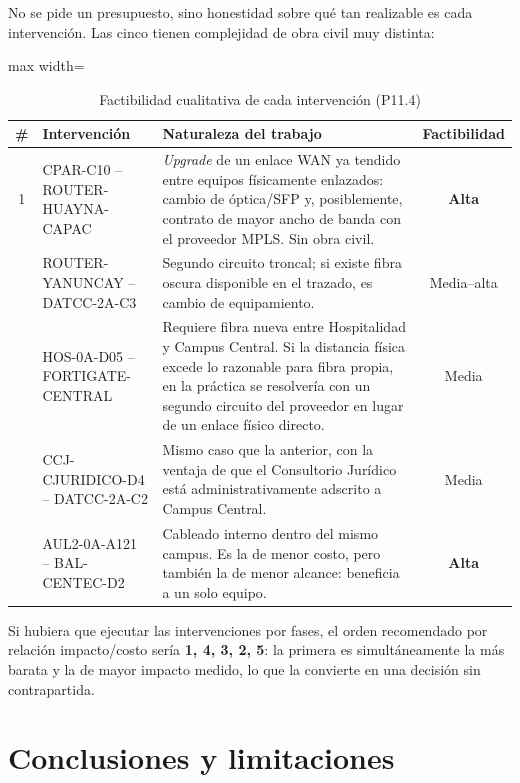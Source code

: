 \documentclass[10pt,a4paper]{extarticle}
\begin{document}
No se pide un presupuesto, sino honestidad sobre qué tan realizable es cada intervención. Las
cinco tienen complejidad de obra civil muy distinta:

\begin{table}[H]
\centering
\caption{Factibilidad cualitativa de cada intervención (P11.4)}
\label{tab:factibilidad}
\small
\begin{adjustbox}{max width=\textwidth}
\begin{tabular}{clp{7.6cm}c}
\toprule
\# & \textbf{Intervención} & \textbf{Naturaleza del trabajo} & \textbf{Factibilidad} \\
\midrule
1 & CPAR-C10 -- ROUTER-HUAYNA-CAPAC &
\textit{Upgrade} de un enlace WAN ya tendido entre equipos físicamente enlazados: cambio de
óptica/SFP y, posiblemente, contrato de mayor ancho de banda con el proveedor MPLS. Sin obra
civil. & \textbf{Alta} \\
\addlinespace
4 & ROUTER-YANUNCAY -- DATCC-2A-C3 &
Segundo circuito troncal; si existe fibra oscura disponible en el trazado, es cambio de
equipamiento. & Media--alta \\
\addlinespace
2 & HOS-0A-D05 -- FORTIGATE-CENTRAL &
Requiere fibra nueva entre Hospitalidad y Campus Central. Si la distancia física excede lo
razonable para fibra propia, en la práctica se resolvería con un segundo circuito del
proveedor en lugar de un enlace físico directo. & Media \\
\addlinespace
3 & CCJ-CJURIDICO-D4 -- DATCC-2A-C2 &
Mismo caso que la anterior, con la ventaja de que el Consultorio Jurídico está
administrativamente adscrito a Campus Central. & Media \\
\addlinespace
5 & AUL2-0A-A121 -- BAL-CENTEC-D2 &
Cableado interno dentro del mismo campus. Es la de menor costo, pero también la de menor
alcance: beneficia a un solo equipo. & \textbf{Alta} \\
\bottomrule
\end{tabular}
\end{adjustbox}
\end{table}

Si hubiera que ejecutar las intervenciones por fases, el orden recomendado por relación
impacto/costo sería \textbf{1, 4, 3, 2, 5}: la primera es simultáneamente la más barata y la
de mayor impacto medido, lo que la convierte en una decisión sin contrapartida.

\section{Conclusiones y limitaciones}
\label{sec:conclusiones}
\end{document}
